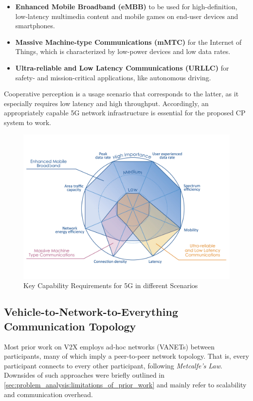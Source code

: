 \begin{itemize}
	\item \textbf{Enhanced Mobile Broadband (eMBB)} to be used for high-definition, low-latency multimedia content and mobile games on end-user devices and smartphones.
	\item \textbf{Massive Machine-type Communications (mMTC)} for the Internet of Things, which is characterized by low-power devices and low data rates.
	\item \textbf{Ultra-reliable and Low Latency Communications (URLLC)} for safety- and mission-critical applications, like autonomous driving. 
\end{itemize}

Cooperative perception is a usage scenario that corresponds to the latter, as it especially requires low latency and high throughput. Accordingly, an appropriately capable 5G network infrastructure is essential for the proposed CP system to work.

\begin{figure}[h]
	\centering
	\includegraphics[width=0.75\linewidth]{98_images/5g_spider_chart}
	\caption[Key Capability Requirements for 5G]{Key Capability Requirements for 5G in different Scenarios \cite{ETSI5G}}
	\label{fig:5g_capabilities}
\end{figure}

\subsection{Vehicle-to-Network-to-Everything Communication Topology}
\label{subsec:concept_design:communication_topology}
Most prior work on V2X employs ad-hoc networks (VANETs) between participants, many of which imply a peer-to-peer network topology. That is, every participant connects to every other participant, following \textit{Metcalfe's Law}. Downsides of such approaches were briefly outlined in \cref{sec:problem_analysis:limitations_of_prior_work} and mainly refer to scalability and communication overhead.

